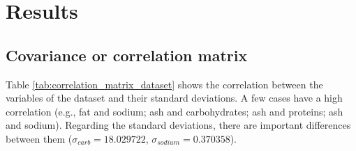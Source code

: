 \documentclass[../main.tex]{subfiles}
\begin{document}
\chapter{Results}

\section{Covariance or correlation matrix}
Table \ref{tab:correlation_matrix_dataset} shows the correlation between the variables of the dataset and their standard deviations. A few cases have a high correlation (e.g., fat and sodium; ash and carbohydrates; ash and proteins; ash and sodium). Regarding the standard deviations, there are important differences between them ($\sigma_{carb}=18.029722$, $\sigma_{sodium}=0.370358$).
\begin{table}[H]
\end{table}
\end{document}
